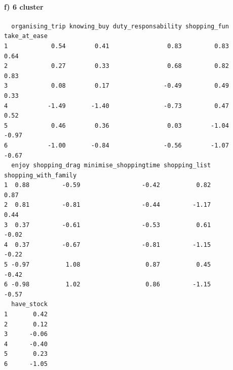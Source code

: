 \documentclass[
  11pt,
]{article}
\newenvironment{Shaded}{\begin{snugshade}}{\end{snugshade}}
\newcommand{\AttributeTok}[1]{\textcolor[rgb]{0.77,0.63,0.00}{#1}}
\newcommand{\CommentTok}[1]{\textcolor[rgb]{0.56,0.35,0.01}{\textit{#1}}}
\newcommand{\ConstantTok}[1]{\textcolor[rgb]{0.00,0.00,0.00}{#1}}
\newcommand{\DecValTok}[1]{\textcolor[rgb]{0.00,0.00,0.81}{#1}}
\newcommand{\FunctionTok}[1]{\textcolor[rgb]{0.00,0.00,0.00}{#1}}
\newcommand{\NormalTok}[1]{#1}
\newcommand{\OtherTok}[1]{\textcolor[rgb]{0.56,0.35,0.01}{#1}}
\newcommand{\SpecialCharTok}[1]{\textcolor[rgb]{0.00,0.00,0.00}{#1}}
\newcommand{\StringTok}[1]{\textcolor[rgb]{0.31,0.60,0.02}{#1}}
\begin{document}
\hypertarget{f-6-cluster}{%
\paragraph{f) 6 cluster}\label{f-6-cluster}}

\begin{Shaded}
\end{Shaded}

\begin{verbatim}
  organising_trip knowing_buy duty_responsability shopping_fun take_at_ease
1            0.54        0.41                0.83         0.83         0.64
2            0.27        0.33                0.68         0.82         0.83
3            0.08        0.17               -0.49         0.49         0.33
4           -1.49       -1.40               -0.73         0.47         0.52
5            0.46        0.36                0.03        -1.04        -0.97
6           -1.00       -0.84               -0.56        -1.07        -0.67
  enjoy shopping_drag minimise_shoppingtime shopping_list shopping_with_family
1  0.88         -0.59                 -0.42          0.82                 0.87
2  0.81         -0.81                 -0.44         -1.17                 0.44
3  0.37         -0.61                 -0.53          0.61                -0.02
4  0.37         -0.67                 -0.81         -1.15                -0.22
5 -0.97          1.08                  0.87          0.45                -0.42
6 -0.98          1.02                  0.86         -1.15                -0.57
  have_stock
1       0.42
2       0.12
3      -0.06
4      -0.40
5       0.23
6      -1.05
\end{verbatim}
\end{document}
